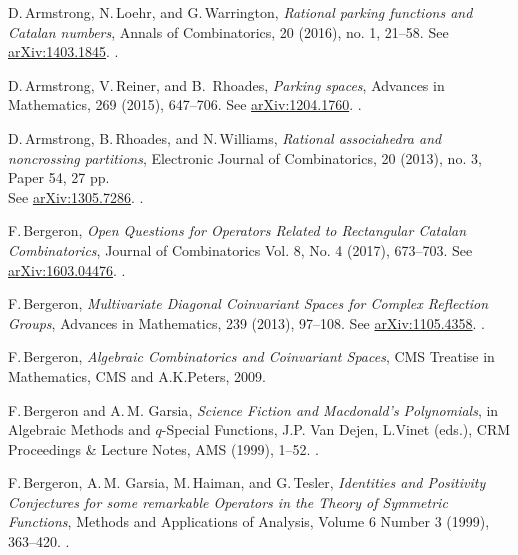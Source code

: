\documentclass[12pt]{amsart}
\theoremstyle{plain}
\theoremstyle{definition}
\theoremstyle{remark}
\begin{document}
 
\def\auteur#1{{\sc #1}}
\def\titreref#1{{\em #1}}
\def\vol#1{{\bf #1}}

\renewcommand{\refname}{{References}}
\begin{thebibliography}{10}  

\auteur{D.\,Armstrong, N.\,Loehr, and G.\,Warrington},
\titreref{Rational parking functions and Catalan numbers},
Annals of Combinatorics, 20 (2016), no. 1, 21--58. 
See \href{http://arxiv.org/abs/1403.1845}{arXiv:1403.1845}. . 
 
\auteur{D.\,Armstrong, V.\,Reiner, and B.~Rhoades},
\titreref{Parking spaces},
Advances in Mathematics, 269 (2015), 647--706. 
See \href{http://arxiv.org/abs/1204.1760}{arXiv:1204.1760}. .

\auteur{D.\,Armstrong, B.\,Rhoades, and N.\,Williams},
\titreref{Rational associahedra and noncrossing partitions},
Electronic Journal of Combinatorics,  20 (2013), no. 3, Paper 54, 27 pp. \\
   See \href{http://arxiv.org/abs/1305.7286}{arXiv:1305.7286}. .

\auteur{F.\,Bergeron},
\titreref{Open Questions for Operators Related to Rectangular Catalan Combinatorics},  
Journal of Combinatorics  Vol. 8, No. 4 (2017),   673--703. 
See \href{http://arxiv.org/abs/1603.04476}{arXiv:1603.04476}. .


\auteur{F.\,Bergeron},
\titreref{Multivariate Diagonal Coinvariant Spaces for Complex Reflection Groups}, 
Advances in Mathematics, 239 (2013), 97--108. 
See \href{http://arxiv.org/abs/1105.4358}{arXiv:1105.4358}. .

\auteur{F.\,Bergeron},
\titreref{Algebraic Combinatorics and Coinvariant Spaces}, 
CMS Treatise in Mathematics, CMS and A.K.Peters,  2009.

\auteur{F.\,Bergeron and A.\,M. Garsia},
\titreref{Science Fiction and Macdonald's Polynomials}, 
in Algebraic Methods and $q$-Special Functions, J.P. Van Dejen, L.Vinet (eds.), 
CRM Proceedings \& Lecture Notes, AMS (1999), 1--52. .

\auteur{F.\,Bergeron, A.\,M. Garsia, M.\,Haiman, and G.\,Tesler},
\titreref{Identities and Positivity Conjectures for some remarkable Operators in the Theory of Symmetric Functions},
Methods and Applications of Analysis, 
 Volume 6 Number 3 (1999), 363--420. .


\end{thebibliography}
\end{document}
